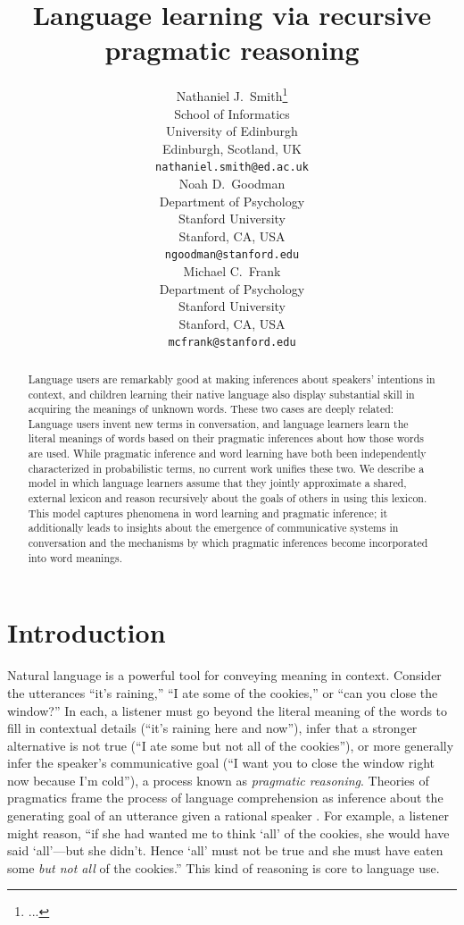 \documentclass{article} %
\title{Language learning via recursive pragmatic reasoning}
\author{
Nathaniel J.~Smith\thanks{...} \\
School of Informatics\\
University of Edinburgh\\
Edinburgh, Scotland, UK\\
\texttt{nathaniel.smith@ed.ac.uk} \\
\AND
Noah D.~Goodman \\
Department of Psychology\\
Stanford University \\
Stanford, CA, USA \\
\texttt{ngoodman@stanford.edu} \\
\And
Michael C.~Frank \\
Department of Psychology \\
Stanford University \\
Stanford, CA, USA \\
\texttt{mcfrank@stanford.edu}}
\begin{document}
\maketitle

\begin{abstract}
  Language users are remarkably good at making inferences about
  speakers' intentions in context, and children learning their native
  language also display substantial skill in acquiring the
  meanings of unknown words. These two cases are deeply related:
  Language users invent new terms in conversation, and language
  learners learn the literal meanings of words based on their
  pragmatic inferences about how those words are used. 
 While pragmatic inference and word
  learning have both been independently characterized in probabilistic
  terms, no current work unifies these two. We describe a
  model in which language learners assume that they jointly
  approximate a shared, external lexicon and reason recursively about
  the goals of others in using this lexicon. This model captures
  phenomena in word learning and pragmatic inference; it additionally
  leads to insights about the emergence of communicative systems in
  conversation and the mechanisms by which pragmatic inferences become
  incorporated into word meanings.
\end{abstract}

\section{Introduction}

Natural language is a powerful tool for conveying meaning in
context. Consider the utterances
``it's raining,'' ``I ate some of the cookies,'' or ``can you close
the window?'' In each, a listener must go beyond the literal meaning
of the words to fill in contextual details (``it's raining here and
now''), infer that a stronger alternative is not true (``I ate some
but not all of the cookies''), or more generally infer the speaker's
communicative goal (``I want you to close the window right now because
I'm cold''), a process known as \textit{pragmatic reasoning}. Theories of pragmatics frame
the process of language comprehension as inference about the
generating goal of an utterance given a rational speaker
\cite{grice1975,dale1995,frank2012}. For example, a listener might
reason, ``if she had wanted me to think `all' of the cookies, she
would have said `all'---but she didn't. Hence `all' must not be true
and she must have eaten some {\it but not all} of the cookies.'' This kind of reasoning is core to language use. 
\end{document}

